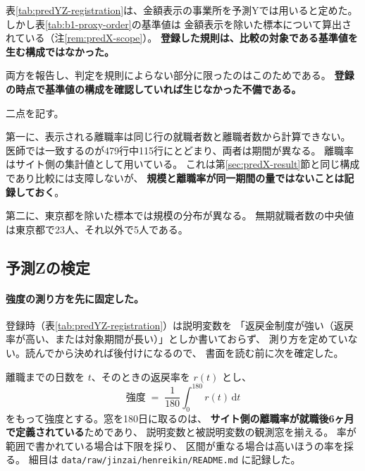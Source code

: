 \begin{remark}[登録した除外規則が基準値の構成と一致していなかった]
\label{rem:predY-registration-error}
表\ref{tab:predYZ-registration}は、金額表示の事業所を予測Yでは用いると定めた。
しかし表\ref{tab:b1-proxy-order}の基準値は
金額表示を除いた標本について算出されている（注\ref{rem:predX-scope}）。
\textbf{登録した規則は、比較の対象である基準値を生む構成ではなかった。}

両方を報告し、判定を規則によらない部分に限ったのはこのためである。
\textbf{登録の時点で基準値の構成を確認していれば生じなかった不備である。}
\end{remark}

\begin{remark}[標本の限界]
\label{rem:predY-limits}
二点を記す。

第一に、表示される離職率は同じ行の就職者数と離職者数から計算できない。
医師では一致するのが479行中115行にとどまり、両者は期間が異なる。
離職率はサイト側の集計値として用いている。
これは第\ref{sec:predX-result}節と同じ構成であり比較には支障しないが、
\textbf{規模と離職率が同一期間の量ではないことは記録しておく}。

第二に、東京都を除いた標本では規模の分布が異なる。
無期就職者数の中央値は東京都で23人、それ以外で5人である。
\end{remark}


\subsection{予測Zの検定}
\label{sec:predZ-result}

\paragraph{強度の測り方を先に固定した。}

登録時（表\ref{tab:predYZ-registration}）は説明変数を
「返戻金制度が強い（返戻率が高い、または対象期間が長い）」としか書いておらず、
測り方を定めていない。読んでから決めれば後付けになるので、
書面を読む前に次を確定した。

離職までの日数を $t$、そのときの返戻率を $r(t)$ とし、
\begin{equation}
\text{強度} \;=\; \frac{1}{180}\int_{0}^{180} r(t)\,\mathrm{d}t
\label{eq:henreikin-strength}
\end{equation}
をもって強度とする。窓を180日に取るのは、
\textbf{サイト側の離職率が就職後6ヶ月で定義されている}ためであり、
説明変数と被説明変数の観測窓を揃える。
率が範囲で書かれている場合は下限を採り、
区間が重なる場合は高いほうの率を採る。
細目は \texttt{data/raw/jinzai/henreikin/README.md} に記録した。


